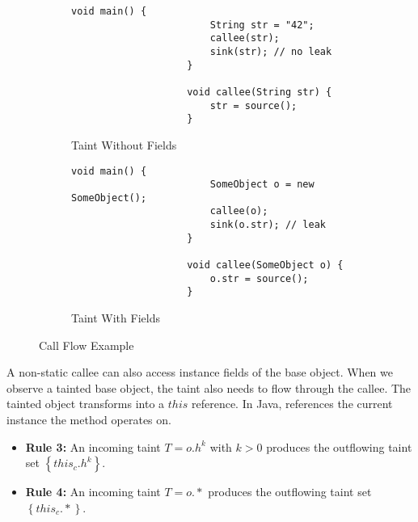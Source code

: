 \documentclass[../draft.tex]{subfiles}
\begin{document}
    \begin{figure}[tbp]
        \centering
        \begin{subfigure}[b]{0.45\textwidth}
            \centering
            \begin{adjustbox}{max width=\columnwidth}
                \begin{lstlisting}[gobble=20]
                    void main() {
                        String str = "42";
                        callee(str);
                        sink(str); // no leak
                    }

                    void callee(String str) {
                        str = source();
                    }
                \end{lstlisting}
            \end{adjustbox}
            \caption{Taint Without Fields}
        \end{subfigure}
        \qquad
        \begin{subfigure}[b]{0.45\textwidth}
            \centering
            \begin{adjustbox}{max width=\columnwidth}
                \begin{lstlisting}[gobble=20]
                    void main() {
                        SomeObject o = new SomeObject();
                        callee(o);
                        sink(o.str); // leak
                    }

                    void callee(SomeObject o) {
                        o.str = source();
                    }
                \end{lstlisting}
            \end{adjustbox}
            \caption{Taint With Fields}
        \end{subfigure}
        \caption{Call Flow Example}
        \label{lst:primret}
    \end{figure}

    A non-static callee can also access instance fields of the base object.
    When we observe a tainted base object, the taint also needs to flow through the callee.
    The tainted object transforms into a $\mathit{this}$ reference.
    In Java,  references the current instance the method operates on.
    \begin{itemize}
        \item[] \textbf{Rule 3:} An incoming taint $T=o.h^k$ with $k > 0$ produces the outflowing taint set $\left\{\mathit{this}_c.h^k\right\}$.
        \item[] \textbf{Rule 4:} An incoming taint $T=o.*$ produces the outflowing taint set $\left\{\mathit{this}_c.*\right\}$.
    \end{itemize}
\end{document}
